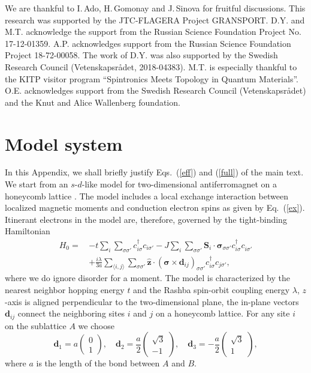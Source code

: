 \documentclass[%
  twocolumn,
  aps,
  prb,
  amsmath,
  amssymb,
  superscriptaddress,
  nofootinbib,
  floatfix
]{revtex4-1}
\newcommand{\s}{\sum\limits}
\newcommand{\be}{\begin{equation}}
\newcommand{\e}{\end{equation}}
\newcommand{\bpm}{\begin{pmatrix}}
\newcommand{\epm}{\end{pmatrix}}
\newcommand{\n}{\nonumber}
\newcommand{\bb}{\boldsymbol}
\newcommand{\0}{^{\phantom{\dagger}}}
\begin{document}
\begin{acknowledgments}
We are thankful to I.\,Ado, H.\,Gomonay and J.\,Sinova for fruitful discussions. This research was supported by the JTC-FLAGERA Project GRANSPORT.  D.Y. and M.T. acknowledge the support from the Russian Science Foundation Project No. 17-12-01359. A.P. acknowledges support from the Russian Science Foundation Project 18-72-00058. The work of D.Y. was also supported by the Swedish Research Council (Vetenskapsr{\aa}det, 2018-04383). M.T. is especially thankful to the KITP visitor program ``Spintronics Meets Topology in Quantum Materials''. O.E. acknowledges support from the Swedish Research Council (Vetenskapsr{\aa}det) and the Knut and Alice Wallenberg foundation.
\end{acknowledgments}

\appendix

\section{Model system}\label{sec:appa}

In this Appendix, we shall briefly justify Eqs.~(\ref{eff}) and (\ref{full}) of the main text. We start from an $s$-$d$-like model for two-dimensional antiferromagnet on a honeycomb lattice \cite{Sumit2019}. The model includes a local exchange interaction between localized magnetic moments and conduction electron spins as given by Eq.~(\ref{ex}). Itinerant electrons in the model are, therefore, governed by the tight-binding Hamiltonian 
\begin{align}
H_0=\,&-t\sum\limits_{i}\s_{\sigma\sigma'}c_{i\sigma}^\dagger c_{i\sigma'}
-J \s_{i} \s_{\sigma\sigma'}\bb{S}_i\cdot \bb{\sigma}_{\sigma\sigma'}c^\dagger_{i\sigma}c\0_{i\sigma'}\n\\
&+\frac{i\lambda}{3a}\s_{\langle i,j\rangle}\sum\limits_{\sigma\sigma'}\hat{\bm{z}}\cdot(\bm{\sigma}\times\bm{d}_{ij})_{\sigma\sigma'}c_{i\sigma}^\dagger c_{j\sigma'},
\label{htb}
\end{align}
where we do ignore disorder for a moment. The model is characterized by the nearest neighbor hopping energy $t$ and the Rashba spin-orbit coupling energy $\lambda$, $z$-axis is aligned perpendicular to the two-dimensional plane, the in-plane vectors $\bm{d}_{ij}$ connect the neighboring sites $i$ and $j$ on a honeycomb lattice. For any site $i$ on the sublattice $A$ we choose
\be
\bb{d}_{1}= a \bpm 0 \\ 1 \epm, \quad \bb{d}_{2}= \frac{a}{2} \bpm \sqrt{3} \\ -1 \epm , \quad \bb{d}_{3}= -\frac{a}{2} \bpm \sqrt{3}  \\ 1 \epm,
\e
where $a$ is the length of the bond between $A$ and $B$.
\end{document}
